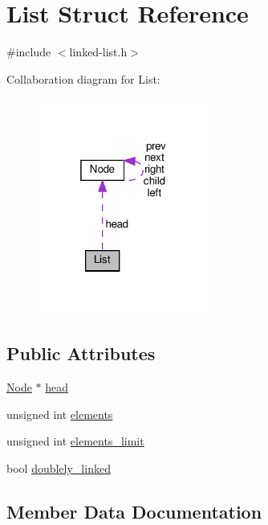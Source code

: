 \hypertarget{structList}{}\section{List Struct Reference}
\label{structList}


{\ttfamily \#include $<$linked-\/list.\+h$>$}



Collaboration diagram for List\+:\nopagebreak
\begin{figure}[H]
\begin{center}
\leavevmode
\includegraphics[width=160pt]{structList__coll__graph}
\end{center}
\end{figure}
\subsection*{Public Attributes}
\begin{DoxyCompactItemize}
\item 
\hyperlink{structNode}{Node} $\ast$ \hyperlink{structList_a443db628080a04a1dacfd3015d164735}{head}
\item 
unsigned int \hyperlink{structList_a388b6c8fff13e506d27071a318c9004f}{elements}
\item 
unsigned int \hyperlink{structList_a3858093f64846444abc72e9b31e00e41}{elements\+\_\+limit}
\item 
bool \hyperlink{structList_a0a6b9ea561ca0cff5c3e7673717676c2}{doublely\+\_\+linked}
\end{DoxyCompactItemize}


\subsection{Member Data Documentation}
\mbox{\label{structList_a0a6b9ea561ca0cff5c3e7673717676c2}} 

